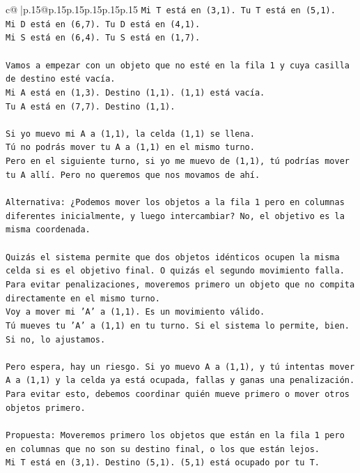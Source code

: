 \documentclass{article}
\begin{document}
{\begin{supertabular}{c@{$\;$}|p{.15\linewidth}@{}p{.15\linewidth}p{.15\linewidth}p{.15\linewidth}p{.15\linewidth}p{.15\linewidth}}
{{{\texttt{Mi T está en (3,1). Tu T está en (5,1).} \\
\texttt{Mi D está en (6,7). Tu D está en (4,1).} \\
\texttt{Mi S está en (6,4). Tu S está en (1,7).} \\
\\ 
\texttt{Vamos a empezar con un objeto que no esté en la fila 1 y cuya casilla de destino esté vacía.} \\
\texttt{Mi A está en (1,3). Destino (1,1). (1,1) está vacía.} \\
\texttt{Tu A está en (7,7). Destino (1,1).} \\
\\ 
\texttt{Si yo muevo mi A a (1,1), la celda (1,1) se llena.} \\
\texttt{Tú no podrás mover tu A a (1,1) en el mismo turno.} \\
\texttt{Pero en el siguiente turno, si yo me muevo de (1,1), tú podrías mover tu A allí. Pero no queremos que nos movamos de ahí.} \\
\\ 
\texttt{Alternativa: ¿Podemos mover los objetos a la fila 1 pero en columnas diferentes inicialmente, y luego intercambiar? No, el objetivo es la misma coordenada.} \\
\\ 
\texttt{Quizás el sistema permite que dos objetos idénticos ocupen la misma celda si es el objetivo final. O quizás el segundo movimiento falla.} \\
\texttt{Para evitar penalizaciones, moveremos primero un objeto que no compita directamente en el mismo turno.} \\
\texttt{Voy a mover mi 'A' a (1,1). Es un movimiento válido.} \\
\texttt{Tú mueves tu 'A' a (1,1) en tu turno. Si el sistema lo permite, bien. Si no, lo ajustamos.} \\
\\ 
\texttt{Pero espera, hay un riesgo. Si yo muevo A a (1,1), y tú intentas mover A a (1,1) y la celda ya está ocupada, fallas y ganas una penalización.} \\
\texttt{Para evitar esto, debemos coordinar quién mueve primero o mover otros objetos primero.} \\
\\ 
\texttt{Propuesta: Moveremos primero los objetos que están en la fila 1 pero en columnas que no son su destino final, o los que están lejos.} \\
\texttt{Mi T está en (3,1). Destino (5,1). (5,1) está ocupado por tu T.} \\
}}}
\end{supertabular}}
\end{document}
